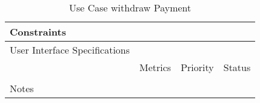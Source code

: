 \begin{table}[H]
\begin{tabularx}{\linewidth}{|l|X|X|X|}
    \hline Constraints                   & \multicolumn{3}{l|}{}                                                                                 \\

    \hline User Interface Specifications & \multicolumn{3}{l|}{}                                                                                 \\

    \hline \multirow{2}{*}{}             & Metrics                                                                           & Priority & Status \\
    \cline{2-4}                          &                                                                                   &          &        \\
    \hline Notes                         & \multicolumn{3}{l|}{}                                                                                 \\
    \hline
  \end{tabularx}
  \caption{Use Case withdraw Payment}
  \label{tab:use_case_withdraw_payment}
\end{table}

